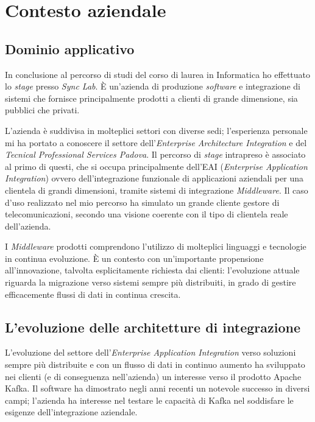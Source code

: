 \chapter{Contesto aziendale}

\section{Dominio applicativo}
In conclusione al percorso di studi del corso di laurea in Informatica ho effettuato lo \textit{stage} presso \textit{Sync Lab}.
È un'azienda di produzione \textit{software} e integrazione di sistemi che fornisce principalmente prodotti a clienti di grande dimensione, sia pubblici che privati.

L'azienda è suddivisa in molteplici settori con diverse sedi; l'esperienza personale mi ha portato a conoscere il settore dell'\textit{Enterprise Architecture Integration} e del \textit{Tecnical Professional Services Padova}.
Il percorso di \textit{stage} intrapreso è associato al primo di questi, che si occupa principalmente dell'EAI (\textit{Enterprise Application Integration}) ovvero dell'integrazione funzionale di applicazioni aziendali per una clientela di grandi dimensioni, tramite sistemi di integrazione \textit{Middleware}.
Il caso d'uso realizzato nel mio percorso ha simulato un grande cliente gestore di telecomunicazioni, secondo una visione coerente con il tipo di clientela reale dell'azienda.

I \textit{Middleware} prodotti comprendono l'utilizzo di molteplici linguaggi e tecnologie in continua evoluzione.
È un contesto con un'importante propensione all'innovazione, talvolta esplicitamente richiesta dai clienti: l'evoluzione attuale riguarda la migrazione verso sistemi sempre più distribuiti, in grado di gestire efficacemente flussi di dati in continua crescita.

\section{L’evoluzione delle architetture di integrazione}

L'evoluzione del settore dell'\textit{Enterprise Application Integration} verso soluzioni sempre più distribuite e con un flusso di dati in continuo aumento ha sviluppato nei clienti (e di conseguenza nell'azienda) un interesse verso il prodotto Apache Kafka.
Il software ha dimostrato negli anni recenti un notevole successo in diversi campi; l'azienda ha interesse nel testare le capacità di Kafka nel soddisfare le esigenze dell'integrazione aziendale.

